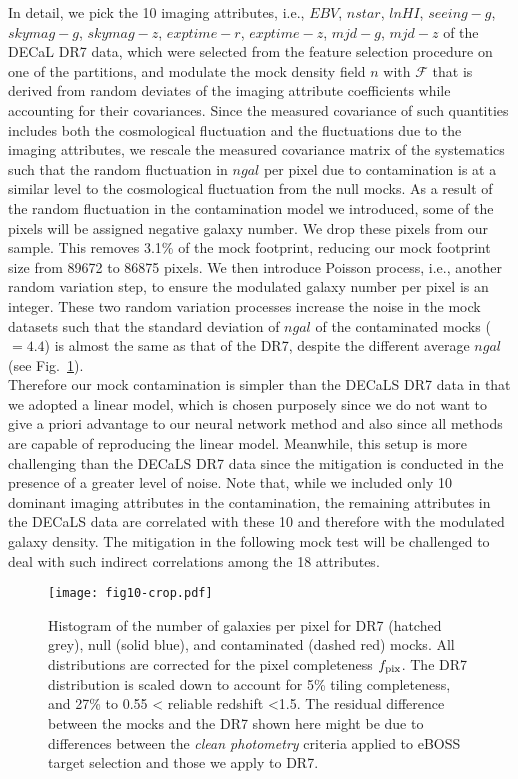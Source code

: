 \documentclass[fleqn, usenatbib]{mnras}
\begin{document}
In detail, we pick the 10 imaging attributes, i.e., $EBV$, $nstar$, $lnHI$, $seeing-g$, $skymag-g$, $skymag-z$, $exptime-r$, $exptime-z$, $mjd-g$, $mjd-z$ of the DECaL DR7 data, which were selected from the feature selection procedure on one of the partitions, and modulate the mock density field $n$ with $\mathcal{F}$ that is derived from random deviates of the imaging attribute coefficients while accounting for their covariances. Since the measured covariance of such quantities includes both the cosmological fluctuation and the fluctuations due to the imaging attributes, we rescale the measured covariance matrix of the systematics such that the random fluctuation in $ngal$ per pixel due to contamination is at a similar level to the cosmological fluctuation from the null mocks. As a result of the random fluctuation in the contamination model we introduced, some of the pixels will be assigned negative galaxy number. We drop these pixels from our sample. This removes 3.1\% of the mock footprint, reducing our mock footprint size from 89672 to 86875 pixels. We then introduce Poisson process, i.e., another random variation step, to ensure the modulated galaxy number per pixel is an integer. These two random variation processes increase the noise in the mock datasets such that the standard deviation of $ngal$ of the contaminated mocks ($=4.4$) is almost the same as that of the DR7, despite the different average $ngal$ (see Fig.~\ref{fig:ngal_hist}).\\


Therefore our mock contamination is simpler than the DECaLS DR7 data in that we adopted a linear model, which is chosen purposely since we do not want to give a priori advantage to our neural network method and also since all methods are capable of reproducing the linear model. Meanwhile, this setup is more challenging than the DECaLS DR7 data since the mitigation is conducted in the presence of a greater level of noise. Note that, while we included only 10 dominant imaging attributes in the contamination, the remaining attributes in the DECaLS data are correlated with these 10 and therefore with the modulated galaxy density. The mitigation in the following mock test will be challenged to deal with such indirect correlations among the 18 attributes. 


\begin{figure}
    \centering
    \texttt{[image: fig10-crop.pdf]}
    \caption{Histogram of the number of galaxies per pixel for DR7 (hatched grey), null (solid blue), and contaminated (dashed red) mocks. All distributions are corrected for the pixel completeness $f_{\rm pix}$. The DR7 distribution is scaled down to account for 5\% tiling completeness, and 27\% to 0.55 < reliable redshift <1.5. The residual difference between the mocks and the DR7 shown here might be due to differences between the \textit{clean photometry} criteria applied to eBOSS target selection and those we apply to DR7.}
    \label{fig:ngal_hist}
\end{figure}{}
\end{document}
